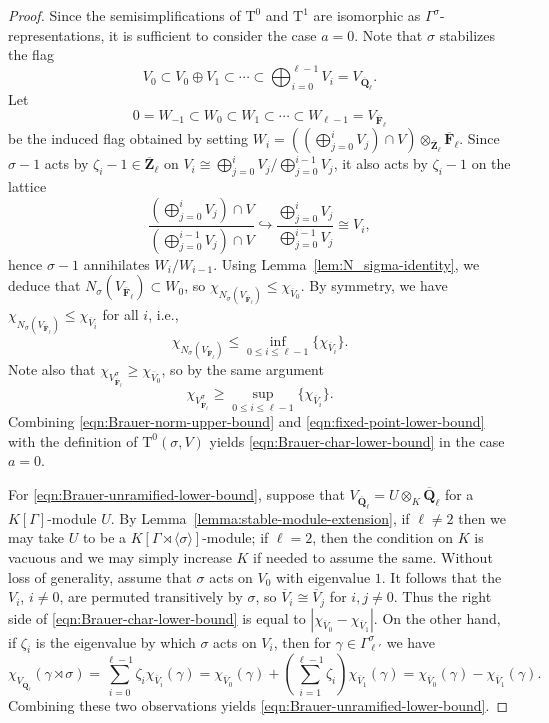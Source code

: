 \documentclass[reqno]{amsart}
\numberwithin{equation}{subsection}
\newcommand{\F}{\mathbf{F}}
\newcommand{\Q}{\mathbf{Q}}
\newcommand{\Z}{\mathbf{Z}}
\newcommand{\ol}[1]{\overline{#1}}
\newcommand{\inj}{\hookrightarrow}
\newcommand{\rT}{\ensuremath{\mathrm{T}}\xspace}
\theoremstyle{remark}
\numberwithin{equation}{subsection}
\numberwithin{figure}{subsection}
\begin{document}
\begin{proof}
    Since the semisimplifications of $\rT^0$ and $\rT^1$ are isomorphic as $\Gamma^\sigma$-representations, it is sufficient to consider the case $a = 0$. Note that $\sigma$ stabilizes the flag 
    \[
    V_0 \subset V_0 \oplus V_1 \subset \cdots \subset \bigoplus_{i=0}^{\ell-1} V_i = V_{\ol\Q_\ell}.
    \]
    Let 
    \[
    0 = W_{-1} \subset W_0 \subset W_1 \subset \cdots \subset W_{\ell-1} = V_{\ol\F_\ell}
    \]
    be the induced flag obtained by setting $W_i = ((\bigoplus_{j=0}^i V_j) \cap V) \otimes_{\ol\Z_\ell}\ol\F_\ell$. Since $\sigma-1$ acts by $\zeta_i - 1 \in \ol\Z_\ell$ on $V_i \cong \bigoplus_{j=0}^i V_j/\bigoplus_{j=0}^{i-1} V_j$, it also acts by $\zeta_i-1$ on the lattice 
    \[
    \frac{(\bigoplus_{j=0}^i V_j) \cap V }{(\bigoplus_{j=0}^{i-1} V_j)  \cap V } \inj \frac{\bigoplus_{j=0}^i V_j}{\bigoplus_{j=0}^{i-1} V_j} \cong V_i,
    \]
    hence $\sigma-1$ annihilates $W_i/W_{i-1}$. Using Lemma~\ref{lem:N_sigma-identity}, we deduce that $N_\sigma(V_{\ol\F_\ell}) \subset W_0$, so $\chi_{N_\sigma(V_{\ol\F_\ell})} \leq \chi_{\ol V_0}$. By symmetry, we have $\chi_{N_\sigma(V_{\ol\F_\ell})} \leq \chi_{\ol V_i}$ for all $i$, i.e., 
    \begin{equation}\label{eqn:Brauer-norm-upper-bound}
    \chi_{N_\sigma(V_{\ol\F_\ell})} \leq \inf_{0 \leq i \leq \ell-1}\{\chi_{\ol V_i}\}.
    \end{equation}
    Note also that $\chi_{V_{\ol\F_\ell}^\sigma} \geq \chi_{\ol V_0}$, so by the same argument
    \begin{equation}\label{eqn:fixed-point-lower-bound}
    \chi_{V_{\ol\F_\ell}^\sigma} \geq \sup_{0 \leq i \leq \ell-1}\{\chi_{\ol V_i}\}.
    \end{equation}
    Combining \eqref{eqn:Brauer-norm-upper-bound} and \eqref{eqn:fixed-point-lower-bound} with the definition of $\rT^0(\sigma, V)$ yields \eqref{eqn:Brauer-char-lower-bound} in the case $a = 0$.
        
    For \eqref{eqn:Brauer-unramified-lower-bound}, suppose that $V_{\ol\Q_\ell} = U \otimes_K \ol\Q_\ell$ for a $K[\Gamma]$-module $U$. By Lemma~\ref{lemma:stable-module-extension}, if $\ell \neq 2$ then we may take $U$ to be a $K[\Gamma \rtimes \langle\sigma\rangle]$-module; if $\ell = 2$, then the condition on $K$ is vacuous and we may simply increase $K$ if needed to assume the same. Without loss of generality, assume that $\sigma$ acts on $V_0$ with eigenvalue $1$. 
    It follows that the $V_i$, $i \neq 0$, are permuted transitively by $\sigma$, so $\ol V_i \cong \ol V_j$ for $i, j \neq 0$. Thus the right side of \eqref{eqn:Brauer-char-lower-bound} is equal to $|\chi_{\ol V_0} - \chi_{\ol V_1}|$. On the other hand, if $\zeta_i$ is the eigenvalue by which $\sigma$ acts on $V_i$, then for $\gamma \in \Gamma^\sigma_{\ell'}$ we have
    \[
    \chi_{V_{\ol\Q_\ell}}(\gamma \rtimes \sigma) = \sum_{i=0}^{\ell-1} \zeta_i \chi_{\ol V_i}(\gamma) = \chi_{\ol V_0}(\gamma) + \left(\sum_{i=1}^{\ell-1} \zeta_i\right) \chi_{\ol V_1}(\gamma) = \chi_{\ol V_0}(\gamma) - \chi_{\ol V_1}(\gamma).
    \]
    Combining these two observations yields \eqref{eqn:Brauer-unramified-lower-bound}.
\end{proof}
\end{document}
